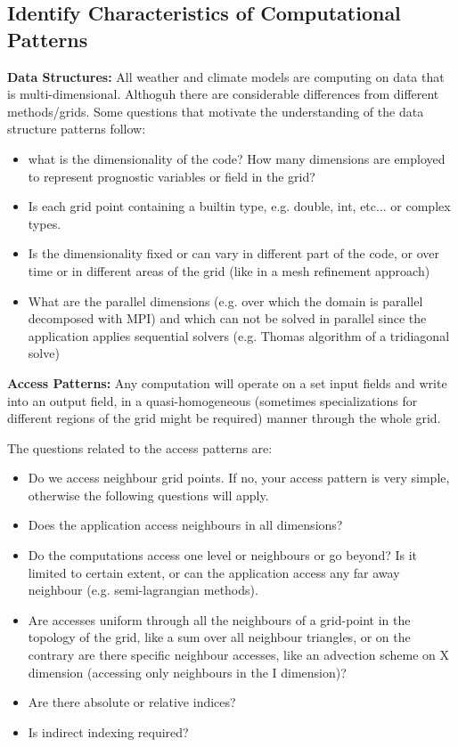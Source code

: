 \documentclass[a4paper,10pt]{scrartcl}
\begin{document}
\subsection{Identify Characteristics of Computational Patterns}
\label{sec:idPattern}
\textbf{Data Structures:}\newline
All weather and climate models are computing on data that is multi-dimensional. Althoguh there are considerable differences from different methods/grids. Some questions that motivate the understanding of the data structure patterns follow:
\begin{itemize}
	\item what is the dimensionality of the code? How many dimensions are employed to represent prognostic variables or field in the grid?
	\item Is each grid point containing a builtin type, e.g. double, int, etc... or complex types. 
	\item Is the dimensionality fixed or can vary in different part of the code, or over time or in different areas of the grid (like in a mesh refinement approach) 
	  \item What are the parallel dimensions (e.g. over which the domain is parallel decomposed with MPI) and which can not be solved in parallel since the application applies sequential solvers (e.g. Thomas algorithm of a tridiagonal solve) 
\end{itemize}

\textbf{Access Patterns:}\newline
Any computation will operate on a set input fields and write into an output field, in a quasi-homogeneous (sometimes specializations for different regions of the grid might be required) manner through the whole grid. 

The questions related to the access patterns are:
\begin{itemize} 
  \item Do we access neighbour grid points. If no, your access pattern is very simple, otherwise the following questions will apply.
  \item Does the application access neighbours in all dimensions? 
  \item Do the computations access one level or neighbours or go beyond? Is it limited to certain extent, or can the application access any far away neighbour (e.g. semi-lagrangian methods).
  \item Are accesses uniform through all the neighbours of a grid-point in the topology of the grid, like a sum over all neighbour
   triangles, or on the contrary are there specific neighbour accesses, like an advection scheme on X dimension (accessing  only neighbours in the I dimension)?
  \item Are there absolute or relative indices?
  \item Is indirect indexing required?
\end{itemize}
\end{document}
